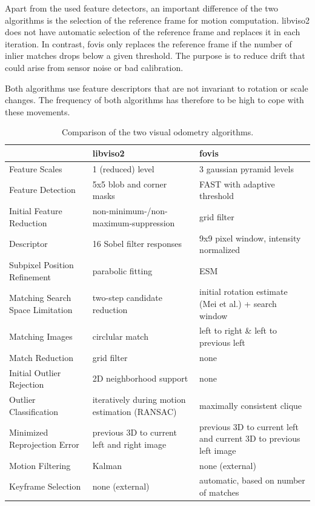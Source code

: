 \documentclass[conference]{IEEEtran}
\begin{document}
Apart from the used feature detectors, an important difference of the two algorithms is the selection of the reference frame for motion computation. libviso2 does not have automatic selection of the reference frame and replaces it in each iteration. In contrast, fovis only replaces the reference frame if the number of inlier matches drops below a given threshold. The purpose is to reduce drift that could arise from sensor noise or bad calibration.

Both algorithms use feature descriptors that are not invariant to rotation or scale changes. The frequency of both algorithms has therefore to be high to cope with these movements.

\begin{table}[ht]
  \caption{Comparison of the two visual odometry algorithms.}
  \label{odometry-comparison}
  \begin{tabularx}{\linewidth}{l|X|X}
    & \textbf{libviso2} & \textbf{fovis}  \\
    \hline
    Feature Scales                  & 1 (reduced) level & 3 gaussian pyramid levels \\[3pt]
    Feature Detection               & 5x5 blob and corner masks & FAST with adaptive threshold  \\[3pt]
    Initial Feature Reduction       & non-minimum-/non-maximum-suppression & grid filter \\[3pt]
    Descriptor                      & 16 Sobel filter responses & 9x9 pixel window, intensity normalized \\[3pt]
    Subpixel Position Refinement    & parabolic fitting & ESM \\[3pt]
    \hline
    Matching Search Space Limitation & two-step candidate reduction & initial rotation estimate (Mei et al.) + search window \\[3pt]
    Matching Images                 & circlular match & left to right \& left to previous left \\[3pt]
    Match Reduction                 & grid filter & none \\[3pt]
    \hline
    Initial Outlier Rejection       & 2D neighborhood support & none \\[3pt]
    Outlier Classification          & iteratively during motion estimation (RANSAC) & maximally consistent clique \\[3pt]
    Minimized Reprojection Error    & previous 3D to current left and right image & previous 3D to current left and current 3D to previous left image \\[3pt]
    \hline
    Motion Filtering                & Kalman & none (external) \\[3pt]
    Keyframe Selection              & none (external) & automatic, based on number of matches \\[3pt]
  \end{tabularx}
\end{table}
\end{document}
